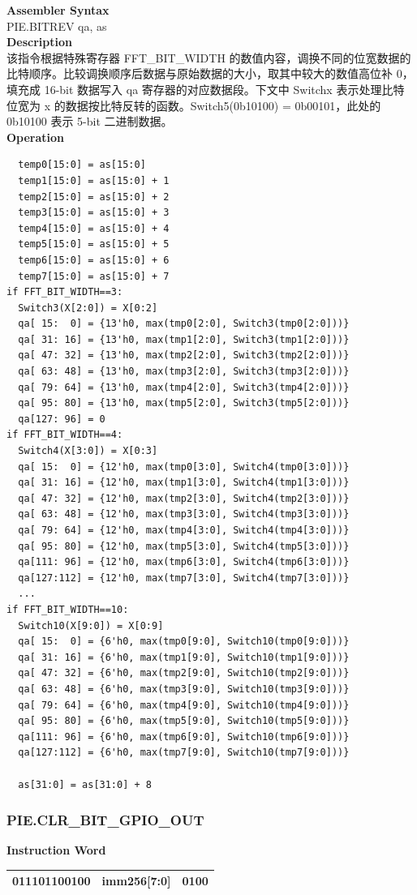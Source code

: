 \textbf{Assembler Syntax} \\
PIE.BITREV qa, as \\
\textbf{Description} \\
该指令根据特殊寄存器 FFT\_BIT\_WIDTH 的数值内容，调换不同的位宽数据的比特顺序。比较调换顺序后数据与原始数据的大小，取其中较大的数值高位补 0，填充成 16-bit 数据写入 qa 寄存器的对应数据段。下文中 Switchx 表示处理比特位宽为 x 的数据按比特反转的函数。Switch5(0b10100) = 0b00101，此处的 0b10100 表示 5-bit 二进制数据。\\
\textbf{Operation}
\begin{lstlisting}
  temp0[15:0] = as[15:0]
  temp1[15:0] = as[15:0] + 1
  temp2[15:0] = as[15:0] + 2
  temp3[15:0] = as[15:0] + 3
  temp4[15:0] = as[15:0] + 4
  temp5[15:0] = as[15:0] + 5
  temp6[15:0] = as[15:0] + 6
  temp7[15:0] = as[15:0] + 7
if FFT_BIT_WIDTH==3:
  Switch3(X[2:0]) = X[0:2]
  qa[ 15:  0] = {13'h0, max(tmp0[2:0], Switch3(tmp0[2:0]))}
  qa[ 31: 16] = {13'h0, max(tmp1[2:0], Switch3(tmp1[2:0]))}
  qa[ 47: 32] = {13'h0, max(tmp2[2:0], Switch3(tmp2[2:0]))}
  qa[ 63: 48] = {13'h0, max(tmp3[2:0], Switch3(tmp3[2:0]))}
  qa[ 79: 64] = {13'h0, max(tmp4[2:0], Switch3(tmp4[2:0]))}
  qa[ 95: 80] = {13'h0, max(tmp5[2:0], Switch3(tmp5[2:0]))}
  qa[127: 96] = 0
if FFT_BIT_WIDTH==4:
  Switch4(X[3:0]) = X[0:3]
  qa[ 15:  0] = {12'h0, max(tmp0[3:0], Switch4(tmp0[3:0]))}
  qa[ 31: 16] = {12'h0, max(tmp1[3:0], Switch4(tmp1[3:0]))}
  qa[ 47: 32] = {12'h0, max(tmp2[3:0], Switch4(tmp2[3:0]))}
  qa[ 63: 48] = {12'h0, max(tmp3[3:0], Switch4(tmp3[3:0]))}
  qa[ 79: 64] = {12'h0, max(tmp4[3:0], Switch4(tmp4[3:0]))}
  qa[ 95: 80] = {12'h0, max(tmp5[3:0], Switch4(tmp5[3:0]))}
  qa[111: 96] = {12'h0, max(tmp6[3:0], Switch4(tmp6[3:0]))}
  qa[127:112] = {12'h0, max(tmp7[3:0], Switch4(tmp7[3:0]))}
  ...
if FFT_BIT_WIDTH==10:
  Switch10(X[9:0]) = X[0:9]
  qa[ 15:  0] = {6'h0, max(tmp0[9:0], Switch10(tmp0[9:0]))}
  qa[ 31: 16] = {6'h0, max(tmp1[9:0], Switch10(tmp1[9:0]))}
  qa[ 47: 32] = {6'h0, max(tmp2[9:0], Switch10(tmp2[9:0]))}
  qa[ 63: 48] = {6'h0, max(tmp3[9:0], Switch10(tmp3[9:0]))}
  qa[ 79: 64] = {6'h0, max(tmp4[9:0], Switch10(tmp4[9:0]))}
  qa[ 95: 80] = {6'h0, max(tmp5[9:0], Switch10(tmp5[9:0]))}
  qa[111: 96] = {6'h0, max(tmp6[9:0], Switch10(tmp6[9:0]))}
  qa[127:112] = {6'h0, max(tmp7[9:0], Switch10(tmp7[9:0]))}

  as[31:0] = as[31:0] + 8
\end{lstlisting}

\newpage
\subsubsection{PIE.CLR\_BIT\_GPIO\_OUT}\label{instruction:PIECLRBITGPIOOUT}
\setlength\tabcolsep{6pt}
\textbf{Instruction Word} \\
\begin{tabular}{|c|c|c|}
	\hline
	011101100100 & imm256[7:0] & 0100 \\
	\hline
\end{tabular}

